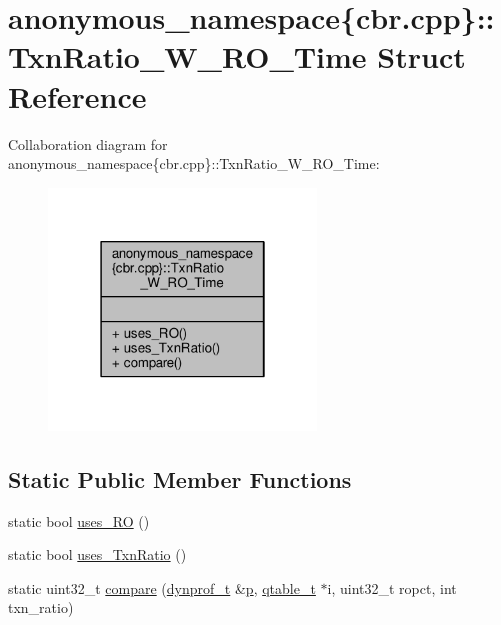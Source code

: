 \hypertarget{structanonymous__namespace_02cbr_8cpp_03_1_1TxnRatio__W__RO__Time}{\section{anonymous\-\_\-namespace\{cbr.\-cpp\}\-:\-:Txn\-Ratio\-\_\-\-W\-\_\-\-R\-O\-\_\-\-Time Struct Reference}
\label{structanonymous__namespace_02cbr_8cpp_03_1_1TxnRatio__W__RO__Time}
}


Collaboration diagram for anonymous\-\_\-namespace\{cbr.\-cpp\}\-:\-:Txn\-Ratio\-\_\-\-W\-\_\-\-R\-O\-\_\-\-Time\-:
\nopagebreak
\begin{figure}[H]
\begin{center}
\leavevmode
\includegraphics[width=202pt]{structanonymous__namespace_02cbr_8cpp_03_1_1TxnRatio__W__RO__Time__coll__graph}
\end{center}
\end{figure}
\subsection*{Static Public Member Functions}
\begin{DoxyCompactItemize}
\item 
static bool \hyperlink{structanonymous__namespace_02cbr_8cpp_03_1_1TxnRatio__W__RO__Time_a48b6f928b3274812b6ab879f1c0a02e3}{uses\-\_\-\-R\-O} ()
\item 
static bool \hyperlink{structanonymous__namespace_02cbr_8cpp_03_1_1TxnRatio__W__RO__Time_a927e933a761db8009f302daee6db5cd1}{uses\-\_\-\-Txn\-Ratio} ()
\item 
static uint32\-\_\-t \hyperlink{structanonymous__namespace_02cbr_8cpp_03_1_1TxnRatio__W__RO__Time_ad8012ff1e51d1a101da30e6a7ad3f5d5}{compare} (\hyperlink{structstm_1_1dynprof__t}{dynprof\-\_\-t} \&\hyperlink{counted__ptr_8hpp_a5c9f59d7c24e3fd6ceae319a968fc3e0}{p}, \hyperlink{structstm_1_1qtable__t}{qtable\-\_\-t} $\ast$i, uint32\-\_\-t ropct, int txn\-\_\-ratio)
\end{DoxyCompactItemize}



